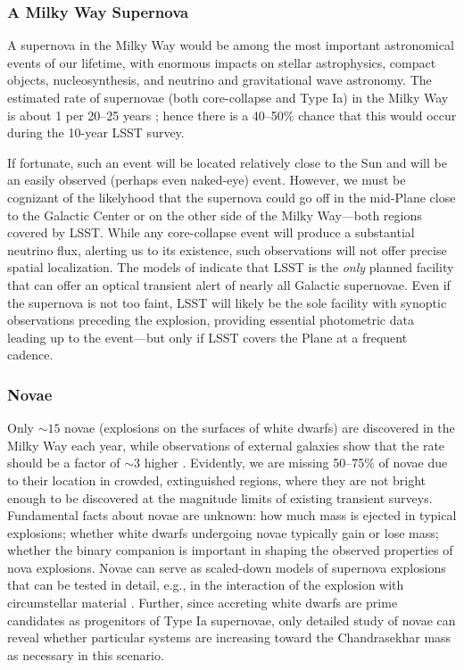 \subsubsection{A Milky Way Supernova}

A supernova in the Milky Way would be among the most important astronomical
events of our lifetime, with enormous impacts on stellar astrophysics, compact
objects, nucleosynthesis, and neutrino and gravitational wave astronomy. The
estimated rate of supernovae (both core-collapse and Type Ia) in the Milky Way
is about 1 per 20--25 years \citep{2013ApJ...778..164A}; hence there is a
40--50\% chance that this would occur during the 10-year LSST survey.

If fortunate, such an event will be located relatively close to the Sun and
will be an easily observed (perhaps even naked-eye) event. However, we must be
cognizant of the likelyhood that the supernova could go off in the mid-Plane
close to the Galactic Center or on the other side of the Milky Way---both
regions covered by LSST. While any core-collapse event will produce a
substantial neutrino flux, alerting us to its existence, such observations will
not offer precise spatial localization. The models of
\citet{2013ApJ...778..164A} indicate that LSST is the \emph{only} planned
facility that can offer an optical transient alert of nearly all Galactic
supernovae. Even if the supernova is not too faint, LSST will likely be the
sole facility with synoptic observations preceding the explosion, providing
essential photometric data leading up to the event---but only if LSST covers
the Plane at a frequent cadence.


\subsubsection{Novae}

Only $\sim 15$ novae (explosions on the surfaces of white dwarfs) are
discovered in the Milky Way each year, while observations of external galaxies
show that the rate should be a factor of $\sim 3$ higher
\citep{2014ASPC..490...77S}.  Evidently, we are missing 50--75\% of novae due
to their location in crowded, extinguished regions, where they are not bright
enough to be discovered at the magnitude limits of existing transient surveys.
Fundamental facts about novae are unknown: how much mass is ejected in typical
explosions; whether white dwarfs undergoing novae typically gain or lose mass;
whether the binary companion is important in shaping the observed properties of
nova explosions.  Novae can serve as scaled-down models of supernova explosions
that can be tested in detail, e.g., in the interaction of the explosion with
circumstellar material \citep[e.g.,][]{2015arXiv151007662C}.  Further, since
accreting white dwarfs are prime candidates as progenitors of Type Ia
supernovae, only detailed study of novae can reveal whether particular systems
are increasing toward the Chandrasekhar mass as necessary in this scenario.

